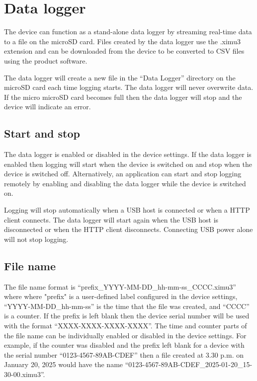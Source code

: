 \section{Data logger}

The device can function as a stand-alone data logger by streaming real-time data to a file on the \ac{microSD} card.  Files created by the data logger use the .ximu3 extension and can be downloaded from the device to be converted to \ac{CSV} files using the product software.

The data logger will create a new file in the \enquote{Data Logger} directory on the \ac{microSD} card each time logging starts.  The data logger will never overwrite data.  If the micro \ac{microSD} card becomes full then the data logger will stop and the device will indicate an error.

\subsection{Start and stop}

The data logger is enabled or disabled in the device settings.  If the data logger is enabled then logging will start when the device is switched on and stop when the device is switched off.  Alternatively, an application can start and stop logging remotely by enabling and disabling the data logger while the device is switched on.

Logging will stop automatically when a \ac{USB} host is connected or when a \ac{HTTP} client connects.  The data logger will start again when the \ac{USB} host is disconnected or when the \ac{HTTP} client disconnects.  Connecting \ac{USB} power alone will not stop logging.

\subsection{File name}

The file name format is \enquote{prefix\_YYYY-MM-DD\_hh-mm-ss\_CCCC.ximu3} where where "prefix" is a user-defined label configured in the device settings, \enquote{YYYY-MM-DD\_hh-mm-ss} is the time that the file was created, and \enquote{CCCC} is a counter.  If the prefix is left blank then the device serial number will be used with the format \enquote{XXXX-XXXX-XXXX-XXXX}.  The time and counter parts of the file name can be individually enabled or disabled in the device settings.  For example, if the counter was disabled and the prefix left blank for a device with the serial number \enquote{0123-4567-89AB-CDEF} then a file created at 3.30 p.m. on January 20, 2025 would have the name \enquote{0123-4567-89AB-CDEF\_2025-01-20\_15-30-00.ximu3}.

